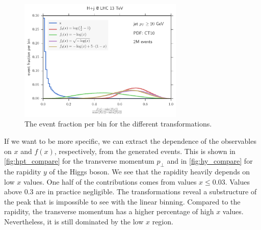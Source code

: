 %
\begin{figure}[]
	\includegraphics[width=0.7\textwidth]{images/x_compare.pdf}
	\caption{The event fraction per bin for the different transformations.}
	\label{fig:x_compare}
\end{figure}
%

If we want to be more specific, we can extract the dependence of the observables on $x$ and $f(x)$, respectively, from the generated events.
This is shown in \cref{fig:hpt_compare} for the transverse momentum $p_\perp$ and in \cref{fig:hy_compare} for the rapidity $y$ of the Higgs boson.
We see that the rapidity heavily depends on low $x$ values.
One half of the contributions comes from values $x \leq \num{0.03}$.
Values above \num{0.3} are in practice negligible.
The transformations reveal a substructure of the peak that is impossible to see with the linear binning.
Compared to the rapidity, the transverse momentum has a higher percentage of high $x$ values.
Nevertheless, it is still dominated by the low $x$ region.

